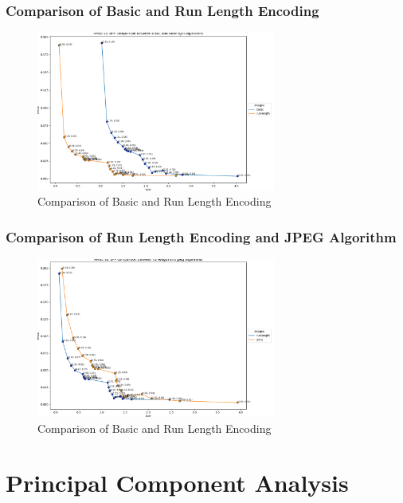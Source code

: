 \documentclass[Serif, 10pt, brown]{beamer}
\theoremstyle{example}
\theoremstyle{plain}
\begin{document}
\begin{frame}
	\frametitle{Comparison of Basic and Run Length Encoding}

	\begin{figure}
		\centering
		\includegraphics[width=0.7\textwidth]{../results/basic_runlength_comparison.png}
		\caption{Comparison of Basic and Run Length Encoding}
	\end{figure}
\end{frame}

\begin{frame}
	\frametitle{Comparison of Run Length Encoding and JPEG Algorithm}

	\begin{figure}
		\centering
		\includegraphics[width=0.7\textwidth]{../results/runlength_jpeg_comparison.png}
		\caption{Comparison of Basic and Run Length Encoding}
	\end{figure}
\end{frame}

\section{Principal Component Analysis}
\end{document}
